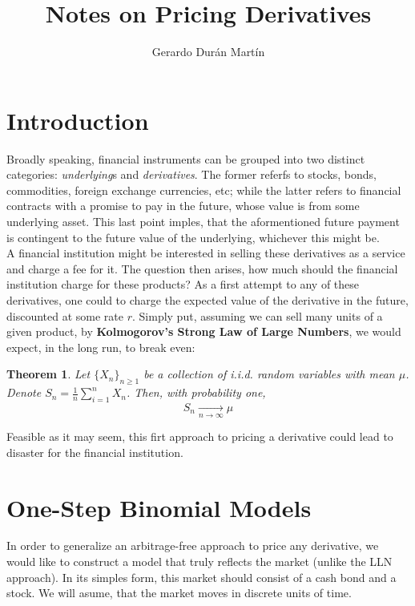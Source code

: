 \documentclass{article}
\title{Notes on Pricing Derivatives}
\author{Gerardo Durán Martín}
\newtheorem{theorem}{Theorem}[section]
\begin{document}
\maketitle


\section{Introduction}
Broadly speaking, financial instruments can be grouped into two distinct categories: \textit{underlying}s and \textit{derivatives}. The former referfs to stocks, bonds, commodities, foreign exchange currencies, etc; while the latter refers to financial contracts with a promise to pay in the future, whose value is  from some underlying asset. This last point imples, that the aformentioned future payment is contingent to the future value of the underlying, whichever this might be.\\

A financial institution might be interested in selling these derivatives as a service and charge a fee for it. The question then arises, how much should the financial institution charge for these products? As a first attempt to  any of these derivatives, one could to charge the expected value of the derivative in the future, discounted at some rate $r$. Simply put, assuming we can sell many units of a given product, by \textbf{Kolmogorov's Strong Law of Large Numbers}, we would expect, in the long run, to break even:

\begin{theorem}
    Let $\{X_n\}_{n\geq 1}$ be a collection of i.i.d. random variables with mean $\mu$. Denote $S_n = \frac{1}{n}\sum_{i=1}^n X_n$. Then, with probability one,
    \begin{equation}
        S_n \xrightarrow[n \rightarrow \infty]{}\mu
    \end{equation}
\end{theorem}


Feasible as it may seem, this firt approach to pricing a derivative could lead to disaster for the financial institution.



\section{One-Step Binomial Models}
In order to generalize an arbitrage-free approach to price any derivative, we would like to construct a model that truly reflects the market (unlike the LLN approach). In its simples form, this market should consist of a cash bond and a stock. We will asume, that the market moves in discrete units of time.\\
\end{document}
